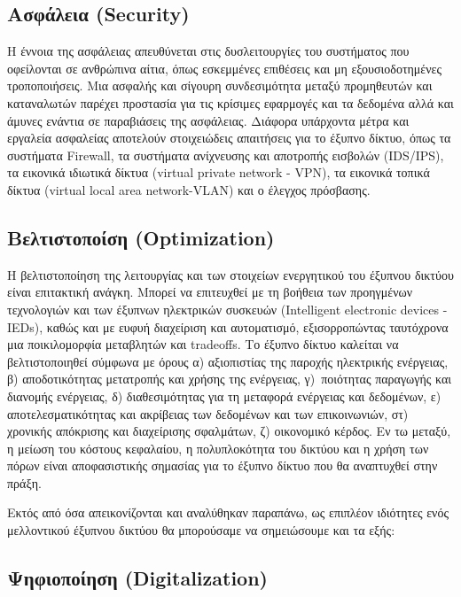 \documentclass[12pt, a4paper, oneside]{report}
\begin{document}
\subsection*{Ασφάλεια (Security)}

Η έννοια της ασφάλειας απευθύνεται στις δυσλειτουργίες του συστήματος που οφείλονται σε ανθρώπινα αίτια, όπως εσκεμμένες επιθέσεις και μη εξουσιοδοτημένες τροποποιήσεις. Μια ασφαλής και σίγουρη συνδεσιμότητα μεταξύ προμηθευτών και καταναλωτών παρέχει προστασία για τις κρίσιμες εφαρμογές και τα δεδομένα αλλά και άμυνες ενάντια σε παραβιάσεις της ασφάλειας. Διάφορα υπάρχοντα μέτρα και εργαλεία ασφαλείας αποτελούν στοιχειώδεις απαιτήσεις για το έξυπνο δίκτυο, όπως τα συστήματα Firewall, τα συστήματα ανίχνευσης και αποτροπής εισβολών (IDS/IPS), τα εικονικά ιδιωτικά δίκτυα (virtual private network - VPN), τα εικονικά τοπικά δίκτυα (virtual local area network-VLAN) και ο έλεγχος πρόσβασης.

\subsection*{Βελτιστοποίση (Optimization)}

Η βελτιστοποίηση της λειτουργίας και των στοιχείων ενεργητικού του έξυπνου δικτύου είναι επιτακτική ανάγκη. Μπορεί να επιτευχθεί με τη βοήθεια των προηγμένων τεχνολογιών και των έξυπνων ηλεκτρικών συσκευών (Intelligent electronic devices - IEDs), καθώς και με ευφυή διαχείριση και αυτοματισμό, εξισορροπώντας ταυτόχρονα μια ποικιλομορφία μεταβλητών και tradeoffs. Το έξυπνο δίκτυο καλείται να βελτιστοποιηθεί σύμφωνα με όρους α) αξιοπιστίας της παροχής ηλεκτρικής ενέργειας, β) αποδοτικότητας μετατροπής και χρήσης της ενέργειας, γ)~ποιότητας παραγωγής και διανομής ενέργειας, δ) διαθεσιμότητας για τη μεταφορά ενέργειας και δεδομένων, ε) αποτελεσματικότητας και ακρίβειας των δεδομένων και των επικοινωνιών, στ) χρονικής απόκρισης και διαχείρισης σφαλμάτων, ζ) οικονομικό κέρδος. Εν τω μεταξύ, η μείωση του κόστους κεφαλαίου, η πολυπλοκότητα του δικτύου και η χρήση των πόρων είναι αποφασιστικής σημασίας για το έξυπνο δίκτυο που θα αναπτυχθεί στην πράξη.

Εκτός από όσα απεικονίζονται και αναλύθηκαν παραπάνω, ως επιπλέον ιδιότητες ενός μελλοντικού έξυπνου δικτύου θα μπορούσαμε να σημειώσουμε και τα εξής:

\subsection*{Ψηφιοποίηση (Digitalization)}
\end{document}
